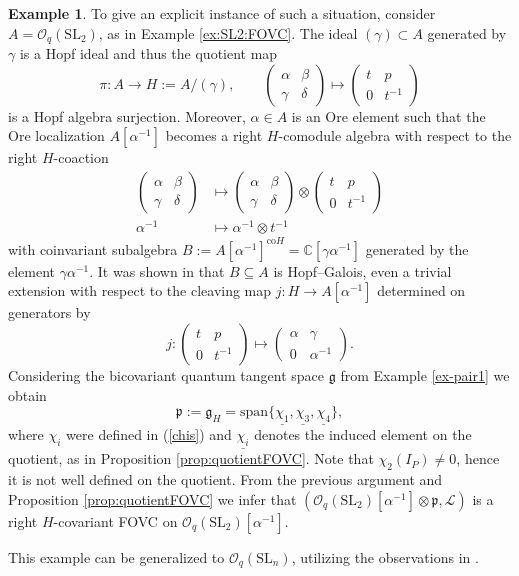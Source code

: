 \documentclass{article}
\theoremstyle{definition}
\newtheorem{example}[thm]{Example}
\newcommand{\cO}{{\mathcal{O}}}
\newcommand{\rSL}{{\mathrm{SL}}}
\begin{document}
\begin{example}
	To give an explicit instance of such a situation, consider $A=\cO_q(\rSL_2)$, as in Example \ref{ex:SL2:FOVC}. The ideal $(\gamma)\subset A$ generated by $\gamma$ is a Hopf ideal and thus the quotient map 
	$$
	\pi\colon A\to H:=A/(\gamma),\qquad\begin{pmatrix}
		\alpha & \beta\\
		\gamma & \delta
	\end{pmatrix}\mapsto\begin{pmatrix}
		t & p\\
		0 & t^{-1}
	\end{pmatrix}
	$$ 
	is a Hopf algebra surjection. Moreover, $\alpha\in A$ is an Ore element such that the Ore localization $A[\alpha^{-1}]$ becomes a right $H$-comodule algebra with respect to the right $H$-coaction
	\begin{align*}
		\begin{pmatrix}
			\alpha & \beta\\
			\gamma & \delta
		\end{pmatrix}&\mapsto\begin{pmatrix}
			\alpha & \beta\\
			\gamma & \delta
		\end{pmatrix}\otimes\begin{pmatrix}
			t & p\\
			0 & t^{-1}
		\end{pmatrix}\\
		\alpha^{-1}&\mapsto\alpha^{-1}\otimes t^{-1}
	\end{align*}
	with coinvariant subalgebra $B:=A[\alpha^{-1}]^{\mathrm{co}H}=\mathbb{C}[\gamma\alpha^{-1}]$ generated by the element $\gamma\alpha^{-1}$. It was shown in \cite{afl} that $B\subseteq A$ is Hopf--Galois, even a trivial extension with respect to the cleaving map $j\colon H\to A[\alpha^{-1}]$ determined on generators by
	$$
	j\colon\begin{pmatrix}
		t & p\\
		0 & t^{-1}
	\end{pmatrix}\mapsto\begin{pmatrix}
		\alpha & \gamma\\
		0 & \alpha^{-1}
	\end{pmatrix}.
	$$
	Considering the bicovariant quantum tangent space $\mathfrak{g}$ from Example \ref{ex-pair1} we obtain
	\begin{equation}\label{tg-space-p}
		\mathfrak{p}:=\mathfrak{g}_H=\mathrm{span}\{\underline{\chi_1},\underline{\chi_3},\underline{\chi_4}\},
	\end{equation}
	where $\chi_i$ were defined in (\ref{chis}) and $\underline{\chi_i}$ denotes the induced element on the quotient, as in Proposition \ref{prop:quotientFOVC}. Note that  $\chi_2(I_P)\neq 0$, hence it is not well defined on the quotient. From the previous argument and Proposition \ref{prop:quotientFOVC} we infer that $(\mathcal{O}_q(\mathrm{SL}_2)[\alpha^{-1}]\otimes\mathfrak{p},\mathscr{L})$ is a right $H$-covariant FOVC on $\mathcal{O}_q(\mathrm{SL}_2)[\alpha^{-1}]$.
	
	This example can be generalized to $\mathcal{O}_q(\mathrm{SL}_n)$, utilizing the observations in \cite[Section 2]{afl}.
\end{example}
\end{document}
